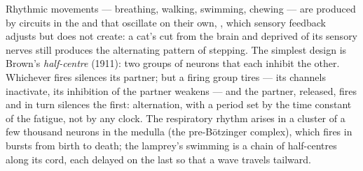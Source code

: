 \begin{proposition}\label{prop:b3:nervous-systems:cpg}
Rhythmic movements --- breathing, walking, swimming, chewing --- are
produced by circuits in the  and  that oscillate on
their own, \emph{}, which sensory feedback
adjusts but does not create: a cat's  cut from the brain and
deprived of its sensory nerves still produces the alternating pattern
of stepping. The simplest design is Brown's \emph{half-centre} (1911):
two groups of neurons that each inhibit the other. Whichever fires
silences its partner; but a firing group tires --- its channels
inactivate, its inhibition of the partner weakens --- and the partner,
released, fires and in turn silences the first: alternation, with a
period set by the time constant of the fatigue, not by any clock. The
respiratory rhythm arises in a cluster of a few thousand neurons in the
medulla (the pre-Bötzinger complex), which fires in bursts from birth
to death; the lamprey's swimming is a chain of half-centres along its
cord, each delayed on the last so that a wave travels tailward.
\end{proposition}

